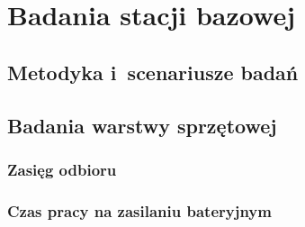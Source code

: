 \chapter{Badania stacji bazowej}
\label{chap:badania}


\section{Metodyka i~scenariusze badań}
\label{sec:metodyka}

\section{Badania warstwy sprzętowej}
\label{sec:badania_sprzet}

\subsection{Zasięg odbioru}
\label{sec:zasieg}

\providecommand{\uzup}[1]{\textcolor{red}{[#1]}}

\subsection{Czas pracy na zasilaniu bateryjnym}
\label{sec:czas_pracy}

